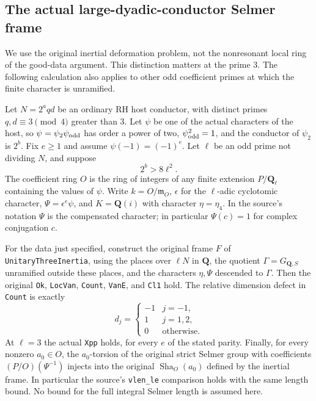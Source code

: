 \subsection{The actual large-dyadic-conductor Selmer frame}
\label{sec:rh-dyadic-host-frame}

We use the original inertial deformation problem, not the nonresonant
local ring of the good-data argument.  This distinction matters at
the prime $3$.  The following calculation also applies to other odd
coefficient primes at which the finite character is unramified.

Let $N=2^a qd$ be an ordinary RH host conductor, with distinct primes
$q,d\equiv3\pmod4$ greater than $3$.  Let $\psi$ be one of the actual
characters of the host, so $\psi=\psi_2\psi_{\rm odd}$ has order a
power of two, $\psi_{\rm odd}^2=1$, and the conductor of $\psi_2$
is $2^b$.  Fix $e\ge1$ and assume $\psi(-1)=(-1)^e$.
Let $\ell$ be an odd prime not dividing $N$, and suppose
\begin{equation}
                         2^b>8\ell^2.                         \tag{DH1}
\end{equation}
The coefficient ring $O$ is the ring of integers of any finite
extension $P/\mathbf Q_\ell$ containing the values of $\psi$.
Write $k=O/\mathfrak m_O$, $\epsilon$ for the $\ell$-adic cyclotomic
character, $\Psi=\epsilon^e\psi$, and $K=\mathbf Q(i)$ with character
$\eta=\eta_4$.  In the source's notation $\Psi$ is the compensated
character; in particular $\Psi(c)=1$ for complex conjugation $c$.

\begin{theorem}
\label{thm:rh-dyadic-host-frame}
For the data just specified, construct the original frame $F$ of
\texttt{UnitaryThreeInertia}, using the places over $\ell N$ in
$\mathbf Q$, the quotient $\Gamma=G_{\mathbf Q,S}$ unramified outside
these places, and the characters $\eta,\Psi$ descended to $\Gamma$.
Then the original \texttt{Ok}, \texttt{LocVan}, \texttt{Count},
\texttt{VanE}, and \texttt{Cl1} hold.  The relative dimension defect
in \texttt{Count} is exactly
\[
 d_j=\begin{cases}
       -1&j=-1,\\
       1&j=1,2,\\
       0&\text{otherwise}.
      \end{cases}                                             \tag{DH2}
\]
At $\ell=3$ the actual \texttt{Xpp} holds, for every $e$ of the
stated parity.  Finally, for every nonzero $a_0\in O$, the
$a_0$-torsion of the original strict Selmer group with coefficients
$(P/O)(\Psi^{-1})$ injects into the original $\operatorname{Sha}_O(a_0)$
defined by the inertial frame.  In particular the source's
\texttt{vlen\_le} comparison holds with the same length bound.
No bound for the full integral Selmer length is assumed here.
\end{theorem}

